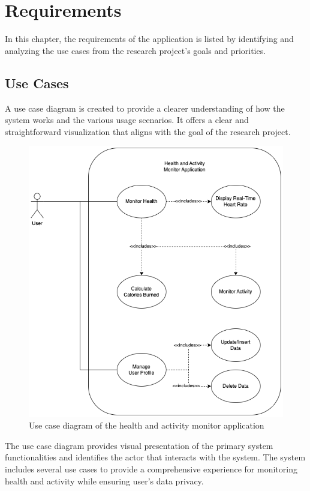 \section{Requirements}
\label{chap:requirements}
In this chapter, the requirements of the application is listed by identifying and analyzing the use cases from the research project's goals and priorities.

\subsection{Use Cases}
\label{chap:use_case}
A use case diagram is created to provide a clearer understanding of how the system works and the various usage scenarios. It offers a clear and straightforward visualization that aligns with the goal of the research project.
\begin{figure}[H]
    \centering
    \includegraphics[width=1\textwidth]{diagrams/usecase.drawio.png}
    \caption{Use case diagram of the health and activity monitor application}
    \label{fig:use_cases}
\end{figure}
\newpage
The use case diagram provides visual presentation of the primary system functionalities and identifies the actor that interacts with the system.
The system includes several use cases to provide a comprehensive experience for monitoring health and activity while ensuring user's data privacy.

